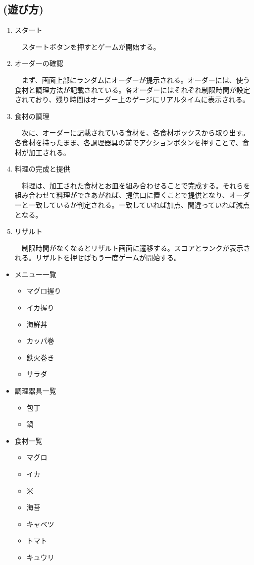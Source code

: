 \documentclass[a4j]{jarticle} %
\begin{document}
\subsection*{(遊び方)}
\begin{enumerate}
  \item スタート\par
  　スタートボタンを押すとゲームが開始する。 
  \item オーダーの確認\par
  　まず、画面上部にランダムにオーダーが提示される。オーダーには、使う食材と調理方法が記載されている。各オーダーにはそれぞれ制限時間が設定されており、残り時間はオーダー上のゲージにリアルタイムに表示される。
  \item 食材の調理\par
  　次に、オーダーに記載されている食材を、各食材ボックスから取り出す。各食材を持ったまま、各調理器具の前でアクションボタンを押すことで、食材が加工される。
  \item 料理の完成と提供\par
  　料理は、加工された食材とお皿を組み合わせることで完成する。それらを組み合わせて料理ができあがれば、提供口に置くことで提供となり、オーダーと一致しているか判定される。一致していれば加点、間違っていれば減点となる。   
  \item リザルト\par
  　制限時間がなくなるとリザルト画面に遷移する。スコアとランクが表示される。リザルトを押せばもう一度ゲームが開始する。
\end{enumerate}
\begin{itemize}
  \item メニュー一覧\par
    \begin{itemize}
      \item マグロ握り
      \item イカ握り
      \item 海鮮丼
      \item カッパ巻
      \item 鉄火巻き
      \item サラダ
    \end{itemize}
  \item 調理器具一覧\par
    \begin{itemize}
      \item 包丁
      \item 鍋
    \end{itemize}
  \item 食材一覧\par
    \begin{itemize}
      \item マグロ
      \item イカ
      \item 米
      \item 海苔
      \item キャベツ
      \item トマト
      \item キュウリ
    \end{itemize}     
\end{itemize}
\end{document}
